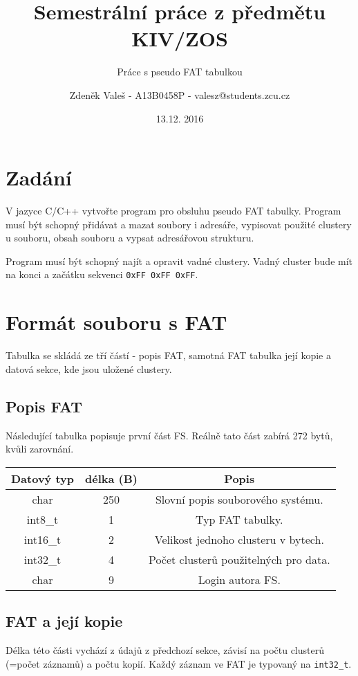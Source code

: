 \documentclass[11pt,a4paper]{scrartcl}
\begin{document}
	\title{Semestrální práce z předmětu KIV/ZOS}
	\subtitle{Práce s pseudo FAT tabulkou}
	\author{Zdeněk Valeš - A13B0458P - valesz@students.zcu.cz}
	\date{13.12. 2016}
	\maketitle
	\newpage
	
	\section{Zadání}
	V jazyce C/C++ vytvořte program pro obsluhu pseudo FAT tabulky. Program musí být schopný přidávat a mazat soubory i adresáře, vypisovat použité clustery u souboru, obsah souboru a vypsat adresářovou strukturu.
	
	Program musí být schopný najít a opravit vadné clustery. Vadný cluster bude mít na konci a začátku sekvenci \verb|0xFF 0xFF 0xFF|.
	
	\section{Formát souboru s FAT}
	Tabulka se skládá ze tří částí - popis FAT, samotná FAT tabulka její kopie a datová sekce, kde jsou uložené clustery.
	
	\subsection{Popis FAT}
	
	Následující tabulka popisuje první část FS. Reálně tato část zabírá 272 bytů, kvůli zarovnání.
	\begin{center}
		\begin{tabular}{|c|c|c|}
			\hline
			Datový typ & délka (B) & Popis \\
			\hline
			char & 250 & Slovní popis souborového systému. \\
			int8\_t & 1 & Typ FAT tabulky. \\
			int16\_t & 2 & Velikost jednoho clusteru v bytech. \\
			int32\_t & 4 & Počet clusterů použitelných pro data. \\
			char & 9 & Login autora FS. \\
			\hline
		\end{tabular}
	\end{center}

	
	\subsection{FAT a její kopie}
	Délka této části vychází z údajů z předchozí sekce, závisí na počtu clusterů (=počet záznamů) a počtu kopií. Každý záznam ve FAT je typovaný na \verb|int32_t|.
	
\end{document}
